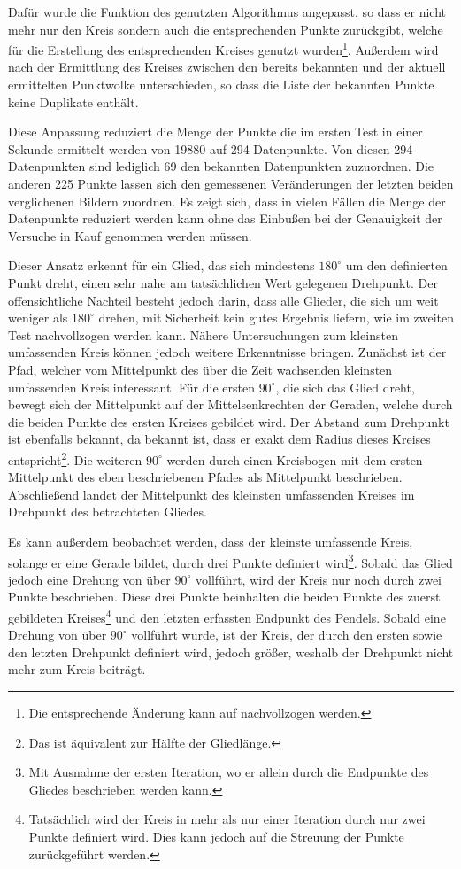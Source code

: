 Dafür wurde die Funktion des genutzten Algorithmus angepasst, so dass er nicht mehr nur den Kreis sondern auch die entsprechenden Punkte zurückgibt, welche für die Erstellung des entsprechenden Kreises genutzt wurden\footnote{Die entsprechende Änderung kann auf  nachvollzogen werden.}.
Au{\ss}erdem wird nach der Ermittlung des Kreises zwischen den bereits bekannten und der aktuell ermittelten Punktwolke unterschieden, so dass die Liste der bekannten Punkte keine Duplikate enthält.

Diese Anpassung reduziert die Menge der Punkte die im ersten Test in einer Sekunde ermittelt werden von 19880 auf 294 Datenpunkte.
Von diesen 294 Datenpunkten sind lediglich 69 den bekannten Datenpunkten zuzuordnen.
Die anderen 225 Punkte lassen sich den gemessenen Veränderungen der letzten beiden verglichenen Bildern zuordnen.
Es zeigt sich, dass in vielen Fällen die Menge der Datenpunkte reduziert werden kann ohne das Einbu{\ss}en bei der Genauigkeit der Versuche in Kauf genommen werden müssen.

Dieser Ansatz erkennt für ein Glied, das sich mindestens $180^\circ$ um den definierten Punkt dreht, einen sehr nahe am tatsächlichen Wert gelegenen Drehpunkt.
Der offensichtliche Nachteil besteht jedoch darin, dass alle Glieder, die sich um weit weniger als $180^\circ$ drehen, mit Sicherheit kein gutes Ergebnis liefern, wie im zweiten Test nachvollzogen werden kann.
Nähere Untersuchungen zum kleinsten umfassenden Kreis können jedoch weitere Erkenntnisse bringen.
Zunächst ist der Pfad, welcher vom Mittelpunkt des über die Zeit wachsenden kleinsten umfassenden Kreis interessant.
Für die ersten $90^\circ$, die sich das Glied dreht, bewegt sich der Mittelpunkt auf der Mittelsenkrechten der Geraden, welche durch die beiden Punkte des ersten Kreises gebildet wird.
Der Abstand zum Drehpunkt ist ebenfalls bekannt, da bekannt ist, dass er exakt dem Radius dieses Kreises entspricht\footnote{Das ist äquivalent zur Hälfte der Gliedlänge.}.
Die weiteren $90^\circ$ werden durch einen Kreisbogen mit dem ersten Mittelpunkt des eben beschriebenen Pfades als Mittelpunkt beschrieben.
Abschlie{\ss}end landet der Mittelpunkt des kleinsten umfassenden Kreises im Drehpunkt des betrachteten Gliedes.

Es kann au{\ss}erdem beobachtet werden, dass der kleinste umfassende Kreis, solange er eine Gerade bildet, durch drei Punkte definiert wird\footnote{Mit Ausnahme der ersten Iteration, wo er allein durch die Endpunkte des Gliedes beschrieben werden kann.}.
Sobald das Glied jedoch eine Drehung von über $90^\circ$ vollführt, wird der Kreis nur noch durch zwei Punkte beschrieben.
Diese drei Punkte beinhalten die beiden Punkte des zuerst gebildeten Kreises\footnote{Tatsächlich wird der Kreis in mehr als nur einer Iteration durch nur zwei Punkte definiert wird. Dies kann jedoch auf die Streuung der Punkte zurückgeführt werden.} und den letzten erfassten Endpunkt des Pendels.
Sobald eine Drehung von über $90^\circ$ vollführt wurde, ist der Kreis, der durch den ersten sowie den letzten Drehpunkt definiert wird, jedoch grö{\ss}er, weshalb der Drehpunkt nicht mehr zum Kreis beiträgt.


